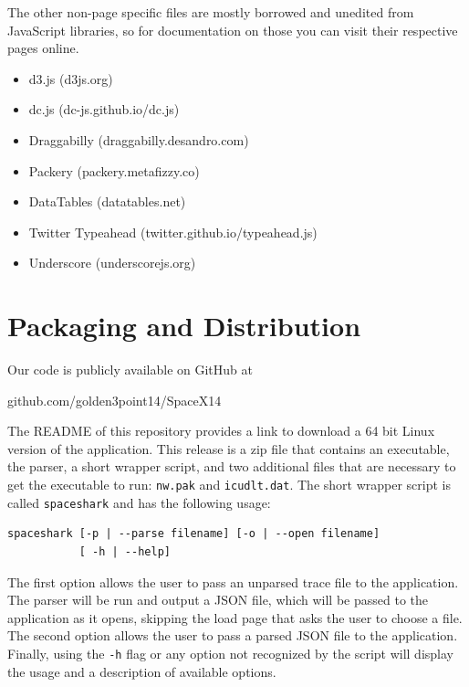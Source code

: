 \documentclass{hmcclinic}
\begin{document}
  The other non-page specific files are mostly borrowed and unedited from
  JavaScript libraries, so for documentation on those you can visit their
  respective pages online.
\begin{itemize}
\item d3.js (d3js.org)
\item dc.js (dc-js.github.io/dc.js)
\item Draggabilly (draggabilly.desandro.com)
\item Packery (packery.metafizzy.co)
\item DataTables (datatables.net)
\item Twitter Typeahead (twitter.github.io/typeahead.js)
\item Underscore (underscorejs.org)
\end{itemize}

\section{Packaging and Distribution}
  Our code is publicly available on GitHub at
\begin{center}
  github.com/golden3point14/SpaceX14
\end{center}
The README of this repository provides a link to download a
  64 bit Linux version of the application. This release is a zip file that
  contains an executable, the parser, a short wrapper script, and two additional
  files that are necessary to get the executable to run: \texttt{nw.pak} and
  \texttt{icudlt.dat}.
  The short wrapper script is called \texttt{spaceshark} and has the following usage:

\begin{verbatim}spaceshark [-p | --parse filename] [-o | --open filename] 
           [ -h | --help]\end{verbatim}

  The first option allows the user to pass an unparsed trace file to the
  application. The parser will be run and output a JSON file, which will be
  passed to the application as it opens, skipping the load page that asks the
  user to choose a file. The second option allows the user to pass a parsed
  JSON file to the application. Finally, using the \texttt{-h} flag or any option
  not recognized by the script will display the usage and a description of
  available options.
\end{document}
